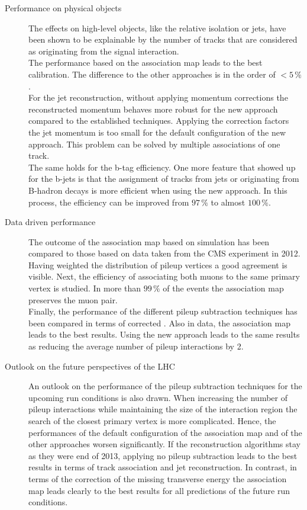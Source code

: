 \begin{description}
\item[Performance on physical objects] The effects on high-level objects, like the relative isolation or jets, have been shown to be explainable by the number of tracks that are considered as originating from the signal interaction. \\
The performance based on the association map leads to the best \MET{} calibration. The difference to the other approaches is in the order of $<5\,\%$. \\
For the jet reconstruction, without applying momentum corrections the reconstructed momentum behaves more robust for the new approach compared to the established techniques. Applying the correction factors the jet momentum is too small for the default configuration of the new approach. This problem can be solved by multiple associations of one track. \\
The same holds for the b-tag efficiency. One more feature that showed up for the b-jets is that the assignment of tracks from jets or originating from B-hadron decays is more efficient when using the new approach. In this process, the efficiency can be improved from $97\,\%$ to almost $100\,\%$.

\item[Data driven performance] The outcome of the association map based on simulation has been compared to those based on data taken from the CMS experiment in 2012. Having weighted the distribution of pileup vertices a good agreement is visible. Next, the efficiency of associating both muons to the same primary vertex is studied. In more than $99\,\%$ of the events the association map preserves the muon pair. \\
Finally, the performance of the different pileup subtraction techniques has been compared in terms of corrected \MET{}. Also in data, the association map leads to the best results. Using the new approach leads to the same results as reducing the average number of pileup interactions by 2.

\item[Outlook on the future perspectives of the LHC] An outlook on the performance of the pileup subtraction techniques for the upcoming run conditions is also drawn. When increasing the number of pileup interactions while maintaining the size of the interaction region the search of the closest primary vertex is more complicated. Hence, the performances of the default configuration of the association map and of the other approaches worsen significantly. If the reconstruction algorithms stay as they were end of 2013, applying no pileup subtraction leads to the best results in terms of track association and jet reconstruction. In contrast, in terms of the correction of the missing transverse energy the association map leads clearly to the best results for all predictions of the future run conditions.

\end{description}


